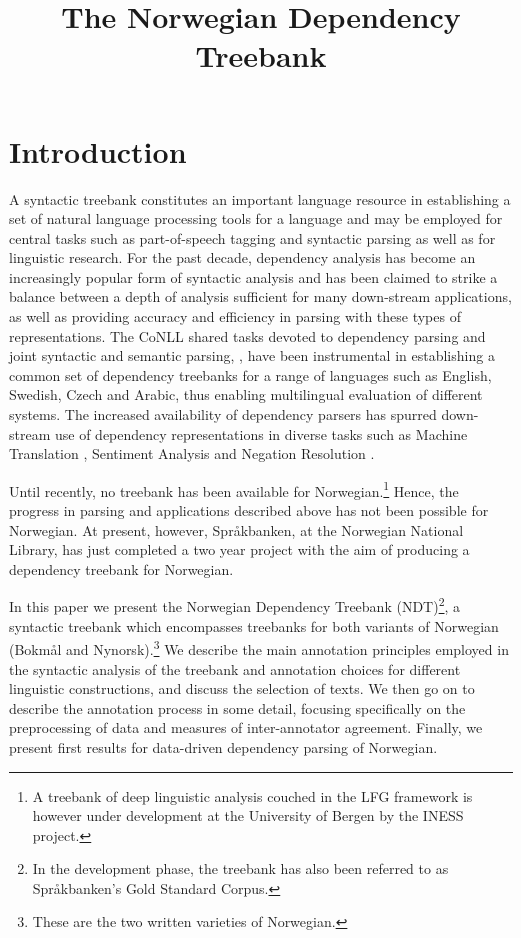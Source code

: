 \documentclass[10pt,a4paper]{article}
\title{The Norwegian Dependency Treebank}
\date{}
\begin{document}
\maketitleabstract

\section{Introduction}
A syntactic treebank constitutes an important language resource in
establishing a set of natural language processing tools for a
language and may be employed for central tasks such as part-of-speech
tagging and syntactic parsing as well as for linguistic research. For the past decade, dependency
analysis has become an increasingly popular form of syntactic analysis
and has been claimed to strike a balance between a depth of analysis
sufficient for many down-stream applications, as well as providing accuracy and
efficiency in parsing with these types of representations. The CoNLL
shared tasks devoted to dependency parsing and joint syntactic and
semantic parsing,
\cite{Niv:Hal:Kub:07,Haj:Cia:Joh:09}, have been instrumental in
establishing a common set of dependency treebanks for a range of
languages such as English, Swedish, Czech and Arabic, %
thus enabling multilingual evaluation of different systems.  The increased
availability of dependency parsers has spurred down-stream use of
dependency representations in diverse tasks such as Machine Translation \cite{Din:Pal:05}, Sentiment Analysis \cite{Wil:Wie:Hof:09} and Negation Resolution \cite{Lap:Vel:Ovr:12}.

Until recently, no treebank has been available for
Norwegian.\footnote{A treebank of deep linguistic analysis couched in
  the LFG framework is however under development at the University of Bergen
  by the INESS project.}
Hence, the progress in parsing and applications
described above has not been possible for Norwegian.
At present, however, Spr{\aa}kbanken, at the Norwegian National Library,
has just completed a two year project with the aim of
producing a dependency treebank for Norwegian.

In this paper we present the Norwegian Dependency Treebank
(NDT)\footnote{In the development phase, the treebank has also been
  referred to as Språkbanken's Gold Standard Corpus.}, a syntactic
treebank which encompasses treebanks for both variants of Norwegian
(Bokm{\aa}l and Nynorsk).\footnote{These are the two written varieties
  of Norwegian.}  We describe the main annotation principles employed
in the syntactic analysis of the treebank and annotation choices
for different linguistic constructions, and discuss the selection of
texts. We then go on to describe the annotation process in some
detail, focusing specifically on the preprocessing of data and
measures of inter-annotator agreement. Finally, we present first
results for data-driven dependency parsing of Norwegian.
\end{document}
